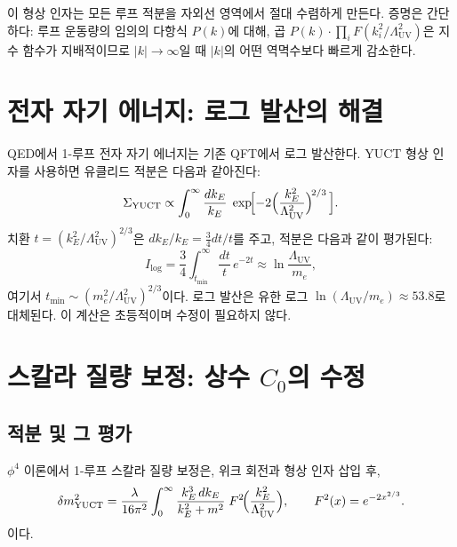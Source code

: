 \documentclass[11pt,a4paper]{article}
\newcommand{\LUV}{\Lambda_{\mathrm{UV}}}
\theoremstyle{remark}
\begin{document}
	이 형상 인자는 모든 루프 적분을 자외선 영역에서 절대 수렴하게 만든다. 증명은 간단하다: 루프 운동량의 임의의 다항식 \(P(k)\)에 대해, 곱 \(P(k) \cdot \prod_i F(k_i^2/\LUV^2)\)은 지수 함수가 지배적이므로 \(|k| \to \infty\)일 때 \(|k|\)의 어떤 역멱수보다 빠르게 감소한다.
	
	\section{전자 자기 에너지: 로그 발산의 해결}
	\label{sec:electron}
	
	QED에서 1-루프 전자 자기 에너지는 기존 QFT에서 로그 발산한다. YUCT 형상 인자를 사용하면 유클리드 적분은 다음과 같아진다:
	\begin{equation}
		\Sigma_{\mathrm{YUCT}} \propto \int_0^{\infty} \frac{dk_E}{k_E}\; \exp\!\Bigl[-2\Bigl(\frac{k_E^2}{\LUV^2}\Bigr)^{\!2/3}\,\Bigr].
		\label{eq:elec_int}
	\end{equation}
	치환 \(t = (k_E^2/\LUV^2)^{2/3}\)은 \(dk_E/k_E = \frac{3}{4} dt/t\)를 주고, 적분은 다음과 같이 평가된다:
	\begin{equation}
		I_{\mathrm{log}} = \frac{3}{4} \int_{t_{\min}}^{\infty} \frac{dt}{t}\, e^{-2t} \approx \ln\frac{\LUV}{m_e},
		\label{eq:elec_result}
	\end{equation}
	여기서 \(t_{\min} \sim (m_e^2/\LUV^2)^{2/3}\)이다. 로그 발산은 유한 로그 \(\ln(\LUV/m_e) \approx 53.8\)로 대체된다. 이 계산은 초등적이며 수정이 필요하지 않다.
	
	\section{스칼라 질량 보정: 상수 \(C_0\)의 수정}
	\label{sec:scalar}
	
	\subsection{적분 및 그 평가}
	
	\(\phi^4\) 이론에서 1-루프 스칼라 질량 보정은, 위크 회전과 형상 인자 삽입 후,
	\begin{equation}
		\delta m^2_{\mathrm{YUCT}} = \frac{\lambda}{16\pi^2} \int_0^{\infty} \frac{k_E^3\, dk_E}{k_E^2 + m^2}\; F^2\!\Bigl(\frac{k_E^2}{\LUV^2}\Bigr), \qquad F^2(x) = e^{-2x^{2/3}}.
		\label{eq:scalar_YUCT}
	\end{equation}
	이다.
	
\end{document}
